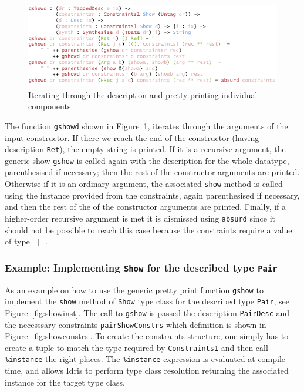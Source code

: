 \documentclass{ituthesis}
\newcommand{\ttconstructor}[1]{\textcolor{constructor-color}{\texttt{#1}}}
\newcommand{\tttype}[1]{\textcolor{type-color}{\texttt{#1}}}
\newcommand{\ttdec}[1]{\textcolor{declared-var-color}{\texttt{#1}}}
\newcommand{\ttliteral}[1]{\textcolor{literal-color}{\texttt{#1}}}
\theoremstyle{break}
\begin{document}
\begin{figure}[ht]
\begin{center}
    \includegraphics[scale=0.5]{Figures/GenericShowDesc.png}
\end{center}
\caption{Iterating through the description and pretty printing individual components}
\label{fig:showgendesc}
\end{figure}

The function \ttdec{gshowd} shown in Figure~\ref{fig:showgendesc}, iterates through the arguments of the input constructor.
If there we reach the end of the constructor (having description \ttconstructor{Ret}), the empty string is printed.
If it is a recursive argument, the generic show \ttdec{gshow} is called again with the description for the whole datatype, parenthesised if necessary; then the rest of the constructor arguments are printed.
Otherwise if it is an ordinary argument, the associated \ttdec{show} method is called using the instance provided from the constraints, again parenthesised if necessary, and then the rest of the of the constructor arguments are printed.
Finally, if a higher-order recursive argument is met it is dismissed using \ttdec{absurd} since it should not be possible to reach this case because the constraints require a value of type \tttype{\_|\_}.


\subsubsection{Example: Implementing \tttype{Show} for the described type \ttdec{Pair}}
\label{ssub:Example:ImplementingShowforPairs}
As an example on how to use the generic pretty print function \ttdec{gshow} to implement the \ttdec{show} method of \tttype{Show} type class for the described type \ttdec{Pair}, see Figure~\ref{fig:showinst}.
The call to \ttdec{gshow} is passed the description \ttdec{PairDesc} and the necesssary constraints \ttdec{pairShowConstrs} which definition is shown in Figure~\ref{fig:showconstrs}.
To create the constraints structure, one simply has to create a tuple to match the type required by \ttdec{Constraints1} and then call \ttliteral{\%instance} the right places.
The \ttliteral{\%instance} expression is evaluated at compile time, and allows Idris to perform type class resolution returning the associated instance for the target type class.
\end{document}
